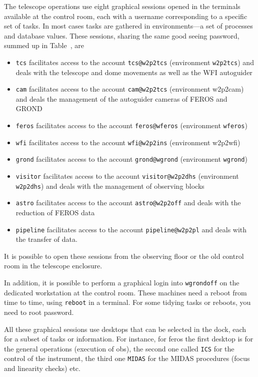 \documentclass[11pt,fleqn,a4paper]{book}
\begin{document}
The telescope operations use eight graphical sessions opened in the terminals available at the control room, each with a username corresponding to a specific set of tasks. In most cases tasks are gathered in environments---a set of processes and database values. These sessions, sharing the same good seeing password, summed up in Table~, are
\begin{itemize}
    \item \texttt{tcs} facilitates access to the account \texttt{tcs@\gls{w2p2tcs}} (environment \texttt{w2p2tcs}) and deals with the telescope and dome movements as well as the WFI autoguider
    \item \texttt{cam} facilitates access to the account \texttt{cam@\gls{w2p2tcs}} (environment \gls{w2p2cam}) and deals the management of the autoguider cameras of FEROS and GROND
    \item \texttt{feros} facilitates access to the account \texttt{feros@\gls{wferos}} (environment \texttt{wferos})
    \item \texttt{wfi} facilitates access to the account \texttt{wfi@\gls{w2p2ins}} (environment \gls{w2p2wfi})
    \item \texttt{grond} facilitates access to the account \texttt{grond@\gls{wgrond}} (environment \texttt{wgrond})
    \item \texttt{visitor} facilitates access to the account \texttt{visitor@\gls{w2p2dhs}} (environment \texttt{w2p2dhs}) and deals with the management of observing blocks
    \item \texttt{astro} facilitates access to the account \texttt{astro@\gls{w2p2off}} and deals with the reduction of FEROS data
    \item \texttt{pipeline} facilitates access to the account \texttt{pipeline@\gls{w2p2pl}} and deals with the transfer of data.
\end{itemize}
It is possible to open these sessions from the observing floor or the old control room in the telescope enclosure.

In addition, it is possible to perform a graphical login into \texttt{wgrondoff} on the dedicated workstation at the control room.  These machines need a reboot from time to time, using \texttt{reboot} in a terminal. For some tidying tasks or reboots, you need to root password.

All these graphical sessions use \glspl{desktop} that can be selected in the dock, each for a subset of tasks or information.  For instance, for \gls{feros} the first desktop is for the general operations (execution of \glspl{ob}), the second one called \texttt{ICS} for the control of the instrument, the third one \texttt{MIDAS} for the MIDAS procedures (focus and linearity checks) etc.
\end{document}
